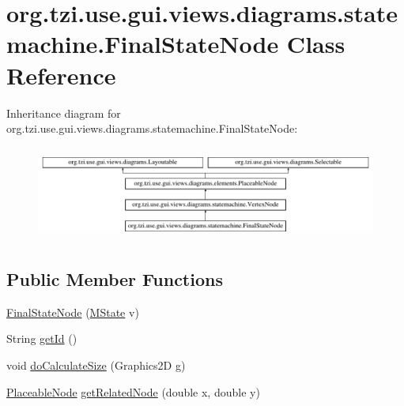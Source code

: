 \hypertarget{classorg_1_1tzi_1_1use_1_1gui_1_1views_1_1diagrams_1_1statemachine_1_1_final_state_node}{\section{org.\-tzi.\-use.\-gui.\-views.\-diagrams.\-statemachine.\-Final\-State\-Node Class Reference}
\label{classorg_1_1tzi_1_1use_1_1gui_1_1views_1_1diagrams_1_1statemachine_1_1_final_state_node}
}
Inheritance diagram for org.\-tzi.\-use.\-gui.\-views.\-diagrams.\-statemachine.\-Final\-State\-Node\-:\begin{figure}[H]
\begin{center}
\leavevmode
\includegraphics[height=3.128492cm]{classorg_1_1tzi_1_1use_1_1gui_1_1views_1_1diagrams_1_1statemachine_1_1_final_state_node}
\end{center}
\end{figure}
\subsection*{Public Member Functions}
\begin{DoxyCompactItemize}
\item 
\hyperlink{classorg_1_1tzi_1_1use_1_1gui_1_1views_1_1diagrams_1_1statemachine_1_1_final_state_node_a7aa160eb8f8c35914e79d21f0e160af2}{Final\-State\-Node} (\hyperlink{classorg_1_1tzi_1_1use_1_1uml_1_1mm_1_1statemachines_1_1_m_state}{M\-State} v)
\item 
String \hyperlink{classorg_1_1tzi_1_1use_1_1gui_1_1views_1_1diagrams_1_1statemachine_1_1_final_state_node_ac31aef1c98c8d73003a20f6349353c62}{get\-Id} ()
\item 
void \hyperlink{classorg_1_1tzi_1_1use_1_1gui_1_1views_1_1diagrams_1_1statemachine_1_1_final_state_node_a39cbc6bba938f0e88b6b6e0fdcadc85f}{do\-Calculate\-Size} (Graphics2\-D g)
\item 
\hyperlink{classorg_1_1tzi_1_1use_1_1gui_1_1views_1_1diagrams_1_1elements_1_1_placeable_node}{Placeable\-Node} \hyperlink{classorg_1_1tzi_1_1use_1_1gui_1_1views_1_1diagrams_1_1statemachine_1_1_final_state_node_af5533c8d495fa9b7a3802649edfed3b2}{get\-Related\-Node} (double x, double y)
\end{DoxyCompactItemize}
